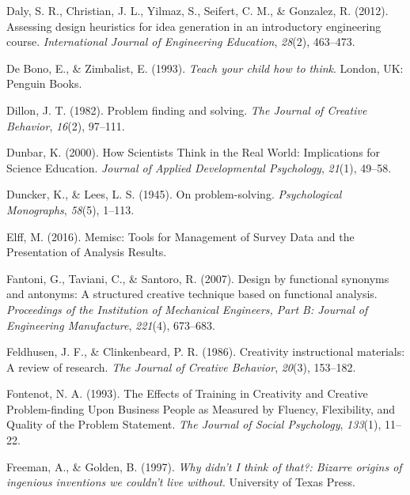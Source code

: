 \documentclass[english,man]{apa6}
\begin{document}
\leavevmode\hypertarget{ref-daly2012assessing}{}%
Daly, S. R., Christian, J. L., Yilmaz, S., Seifert, C. M., \& Gonzalez,
R. (2012). Assessing design heuristics for idea generation in an
introductory engineering course. \emph{International Journal of
Engineering Education}, \emph{28}(2), 463--473.

\leavevmode\hypertarget{ref-de1993teach}{}%
De Bono, E., \& Zimbalist, E. (1993). \emph{Teach your child how to
think}. London, UK: Penguin Books.

\leavevmode\hypertarget{ref-dillon_problem_1982}{}%
Dillon, J. T. (1982). Problem finding and solving. \emph{The Journal of
Creative Behavior}, \emph{16}(2), 97--111.

\leavevmode\hypertarget{ref-dunbar_how_2000}{}%
Dunbar, K. (2000). How Scientists Think in the Real World: Implications
for Science Education. \emph{Journal of Applied Developmental
Psychology}, \emph{21}(1), 49--58.

\leavevmode\hypertarget{ref-duncker_problem-solving_1945}{}%
Duncker, K., \& Lees, L. S. (1945). On problem-solving.
\emph{Psychological Monographs}, \emph{58}(5), 1--113.

\leavevmode\hypertarget{ref-ElffmemiscToolsManagement2016}{}%
Elff, M. (2016). Memisc: Tools for Management of Survey Data and the
Presentation of Analysis Results.

\leavevmode\hypertarget{ref-fantoni2007design}{}%
Fantoni, G., Taviani, C., \& Santoro, R. (2007). Design by functional
synonyms and antonyms: A structured creative technique based on
functional analysis. \emph{Proceedings of the Institution of Mechanical
Engineers, Part B: Journal of Engineering Manufacture}, \emph{221}(4),
673--683.

\leavevmode\hypertarget{ref-feldhusen1986creativity}{}%
Feldhusen, J. F., \& Clinkenbeard, P. R. (1986). Creativity
instructional materials: A review of research. \emph{The Journal of
Creative Behavior}, \emph{20}(3), 153--182.

\leavevmode\hypertarget{ref-fontenot_effects_1993}{}%
Fontenot, N. A. (1993). The Effects of Training in Creativity and
Creative Problem-finding Upon Business People as Measured by Fluency,
Flexibility, and Quality of the Problem Statement. \emph{The Journal of
Social Psychology}, \emph{133}(1), 11--22.

\leavevmode\hypertarget{ref-freeman1997didn}{}%
Freeman, A., \& Golden, B. (1997). \emph{Why didn't I think of that?:
Bizarre origins of ingenious inventions we couldn't live without}.
University of Texas Press.
\end{document}
